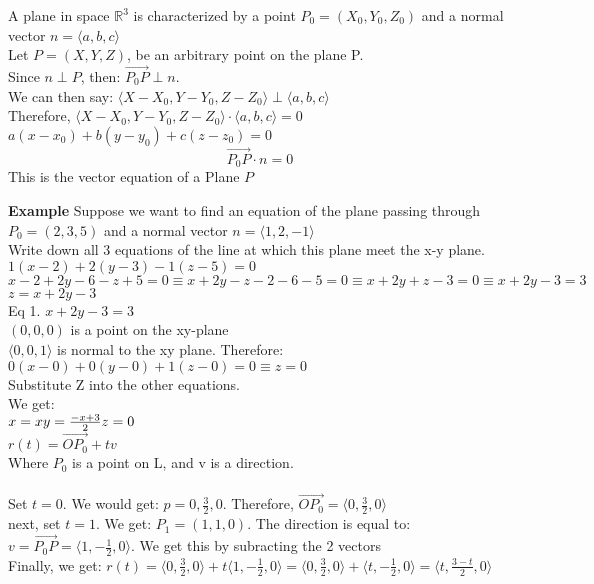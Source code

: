 \documentclass[]{article}
\title{\docTitle}
\author{\docAuthor}
\date{\today}
\begin{document}
\maketitle
A plane in space \(\mathbb{R}^3\) is characterized by a point $P_0 = (X_0, Y_0, Z_0)$ and a normal vector $n=\langle a,b,c\rangle $\\
Let $P=(X,Y,Z)$, be an arbitrary point on the plane P.\\
Since $n\perp P$, then: $\overrightarrow{P_0P} \perp n$.\\
We can then say: $\langle X-X_0, Y-Y_0, Z-Z_0\rangle \perp \langle a,b,c \rangle$\\
Therefore, $\langle X-X_0, Y-Y_0, Z-Z_0\rangle \cdot \langle a,b,c \rangle = 0$\\
$a(x-x_0) + b(y-y_0) + c(z-z_0) = 0$\\

$$\overrightarrow{P_0P}\cdot{n} = 0$$
This is the vector equation of a Plane $P$

\textbf{Example}
Suppose we want to find an equation of the plane passing through $P_0 = (2,3,5)$ and a normal vector $n = \langle 1,2,-1\rangle$\\
Write down all 3 equations of the line at which this plane meet the x-y plane.\\
$1(x-2)+2(y-3)-1(z-5) = 0$\\
$x-2 + 2y-6-z+5 = 0 \equiv x + 2y - z -2 -6-5 = 0 \equiv x + 2y + z - 3 = 0 \equiv x + 2y-3 = 3$\\
$z = x + 2y - 3$\\
Eq 1. $x + 2y-3 = 3$\\

$(0,0,0)$ is a point on the xy-plane\\
$\langle 0,0,1\rangle$ is normal to the xy plane.
Therefore:
$0(x-0)+0(y-0)+1(z-0) = 0 \equiv z=0$\\
Substitute Z into the other equations.\\
We get:\\
$x = x\\y = \frac{-x+3}{2}\\z = 0$\\
$r(t) = \overrightarrow{OP_0} + tv$\\
Where $P_0$ is a point on L, and v is a direction.\\
\\
Set $t=0$. We would get: $p=0,\frac{3}{2},0$. Therefore, $\overrightarrow{OP_0} = \langle 0, \frac{3}{2}, 0\rangle$\\
next, set $t=1$. We get:  $P_1 = (1, 1, 0)$. The direction is equal to: $v = \overrightarrow{P_0P} = \langle 1, -\frac{1}{2}, 0\rangle$. We get this by subracting the 2 vectors\\
Finally, we get:
$r(t) = \langle0,\frac{3}{2},0\rangle + t\langle1, -\frac{1}{2}, 0\rangle = \langle0,\frac{3}{2}, 0 \rangle+ \langle t, -\frac{1}{2}, 0\rangle = \langle t, \frac{3-t}{2}, 0\rangle$\\
\end{document}
